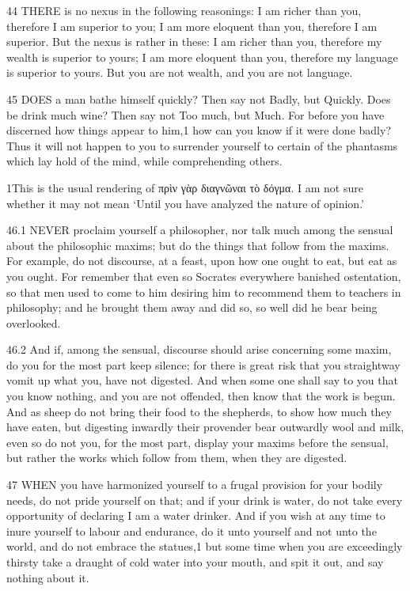     44   THERE is no nexus in the following reasonings: I am richer than you, therefore I am superior to you; I am more eloquent than you, therefore I am superior. But the nexus is rather in these: I am richer than you, therefore my wealth is superior to yours; I am more eloquent than you, therefore my language is superior to yours. But you are not wealth, and you are not language.

    45   DOES a man bathe himself quickly? Then say not Badly, but Quickly. Does be drink much wine? Then say not Too much, but Much. For before you have discerned how things appear to him,1 how can you know if it were done badly? Thus it will not happen to you to surrender yourself to certain of the phantasms which lay hold of the mind, while comprehending others.

    1This is the usual rendering of  πρὶν γὰρ διαγνῶναι τὸ δόγμα.  I am not sure whether it may not mean  ‘Until you have analyzed the nature of opinion.’

    46.1   NEVER proclaim yourself a philosopher, nor talk much among the sensual about the philosophic maxims; but do the things that follow from the maxims. For example, do not discourse, at a feast, upon how one ought to eat, but eat as you ought. For remember that even so Socrates everywhere banished ostentation, so that men used to come to him desiring him to recommend them to teachers in philosophy; and he brought them away and did so, so well did he bear being overlooked.

    46.2   And if, among the sensual, discourse should arise concerning some maxim, do you for the most part keep silence; for there is great risk that you straightway vomit up what you, have not digested. And when some one shall say to you that you know nothing, and you are not offended, then know that the work is begun. And as sheep do not bring their food to the shepherds, to show how much they have eaten, but digesting inwardly their provender bear outwardly wool and milk, even so do not you, for the most part, display your maxims before the sensual, but rather the works which follow from them, when they are digested.

    47   WHEN you have harmonized yourself to a frugal provision for your bodily needs, do not pride yourself on that; and if your drink is water, do not take every opportunity of declaring I am a water drinker. And if you wish at any time to inure yourself to labour and endurance, do it unto yourself and not unto the world, and do not embrace the statues,1 but some time when you are exceedingly thirsty take a draught of cold water into your mouth, and spit it out, and say nothing about it.

